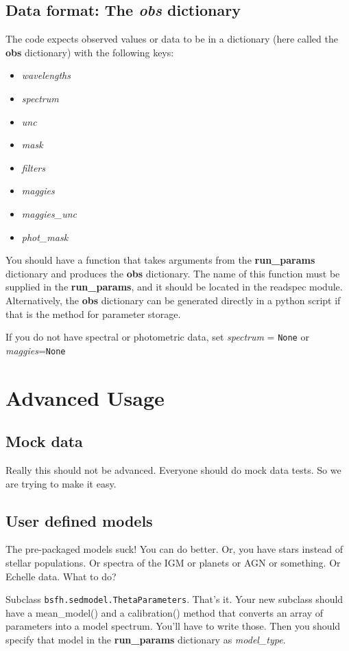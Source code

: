 \subsection{Data format: The \emph{obs} dictionary}
The code expects observed values or data to be in a dictionary (here
called the {\bf obs} dictionary) with the following keys:
\begin{itemize}
\item {\it wavelengths}
\item {\it spectrum}
\item {\it unc}
\item {\it mask}
\item {\it filters}
\item {\it maggies}
\item {\it maggies_unc}
\item {\it phot_mask}
\end{itemize}

You should have a function that takes arguments from the {\bf
run_params} dictionary and produces the {\bf obs} dictionary.  The
name of this function must be supplied in the {\bf run_params}, and it
should be located in the readspec module. Alternatively, the {\bf obs}
dictionary can be generated directly in a python script if that is the
method for parameter storage.

If you do not have spectral or photometric data, set {\it spectrum} =
\texttt{None} or {\it maggies}=\texttt{None}

\section{Advanced Usage}

\subsection{Mock data}
Really this should not be advanced.  Everyone should do mock data
tests.  So we are trying to make it easy.

\subsection{User defined models}
The pre-packaged models suck!  You can do better.  Or, you have stars
instead of stellar populations.  Or spectra of the IGM or planets or
AGN or something. Or Echelle data. What to do?

Subclass \texttt{bsfh.sedmodel.ThetaParameters}.  That's it.  Your new
subclass should have a mean_model() and a calibration() method that
converts an array of parameters into a model spectrum.  You'll have to
write those.  Then you should specify that model in the {\bf
run_params} dictionary as {\it model_type}.

